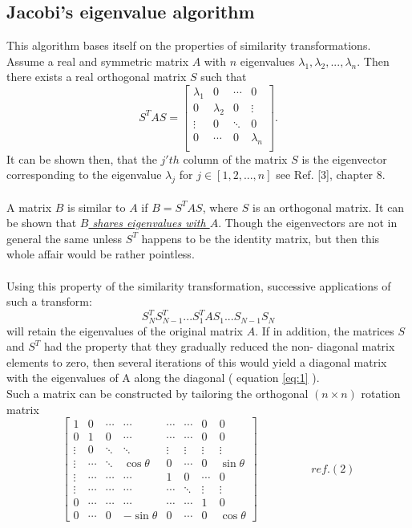 \documentclass[10pt,a4paper]{article}
\begin{document}
\subsection{Jacobi's eigenvalue algorithm}\label{jacobi algo}
This algorithm bases itself on the properties of similarity transformations. Assume a real and symmetric matrix $A$ with $n$ eigenvalues $\lambda_1,\lambda_2,...,\lambda_n$. Then there exists a real orthogonal matrix $S$ such that
\begin{equation}\label{eq:1}
S^TAS=\begin{bmatrix}
\lambda_1 & 0 & \cdots & 0 \\
0 & \lambda_2 & 0 & \vdots \\
\vdots & 0 & \ddots & 0 \\
0 & \cdots & 0 & \lambda_n \\
\end{bmatrix}.
\end{equation}
It can be shown then, that the $j'th$ column of the matrix $S$ is the eigenvector corresponding to the eigenvalue $\lambda_j$ for $j \in [1,2,...,n]$ see Ref. [3], chapter 8.\\\\A matrix $B$ is similar to $A$ if $B=S^{T}AS$, where $S$ is an orthogonal matrix. It can be shown that \hyperref[proof of same eigenvalues]{\emph{$B$ shares eigenvalues with $A$}}. Though the eigenvectors are not in general the same unless $S^T$ happens to be the identity matrix, but then this whole affair would be rather pointless.\\\\Using this property of the similarity transformation, successive applications of such a transform:
$$
S_N^TS_{N-1}^T...S_1^TAS_1...S_{N-1}S_N
$$
will retain the eigenvalues of the original matrix $A$. If in addition, the matrices $S$ and $S^T$ had the property that they gradually reduced the non- diagonal matrix elements to zero, then several iterations of this would yield a diagonal matrix with the eigenvalues of A along the diagonal ( equation \ref{eq:1} ).\\Such a matrix can be constructed by tailoring the orthogonal $(n\times n)$ rotation matrix
\begin{equation*}
\begin{bmatrix}
1 & 0 & \cdots & \cdots & \cdots & \cdots & 0 & 0\\ 
 0& 1 & 0 & \cdots &\cdots  &\cdots  &0  &0 \\ 
 \vdots& 0 & \ddots & \ddots & \vdots & \vdots & \vdots &\vdots \\ 
 \vdots& \cdots & \ddots & \cos\theta &0  & \cdots & 0 &\sin\theta \\ 
\vdots & \cdots & \cdots & \cdots & 1 & 0 & \cdots &0 \\ 
 \vdots& \cdots & \cdots & \cdots & \cdots & \ddots & \vdots & \vdots\\ 
0 & \cdots & \cdots &\cdots  & \cdots &\cdots  & 1 & 0\\ 
0 &\cdots  & 0 & -\sin\theta & 0 & \cdots & 0 & \cos\theta
\end{bmatrix}\hspace{2cm} ref.(2)
\end{equation*}
\end{document}
